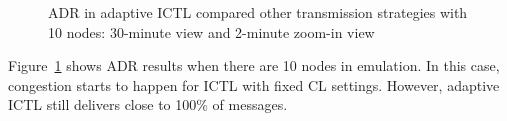 \documentclass[12pt]{report}
\begin{document}
\begin{figure}[H]
  \caption{\label{fig:adaptive_adr_10}ADR in adaptive ICTL compared other transmission strategies with 10 nodes: 30-minute view and 2-minute zoom-in view}
\end{figure}

Figure~\ref{fig:adaptive_adr_10} shows ADR results when there are 10 nodes in emulation. In this case, congestion starts to happen for ICTL with fixed CL settings. However, adaptive ICTL still delivers close to 100\% of messages.
\end{document}
